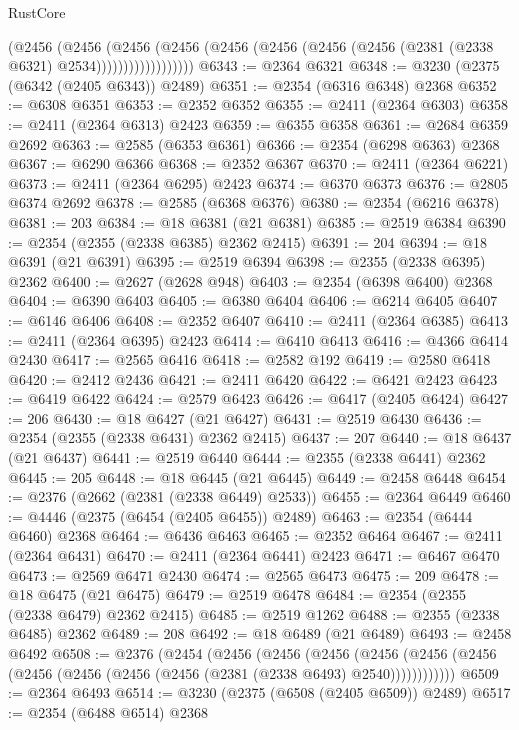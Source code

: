 \begin{lexlean}{RustCore}
\begin{coremodule}
                      (@2456
                        (@2456
                          (@2456
                            (@2456
                              (@2456
                                (@2456 (@2456 (@2456 (@2381 (@2338 @6321) @2534))))))))))))))))))
@6343 := @2364 @6321
@6348 := @3230 (@2375 (@6342 (@2405 @6343)) @2489)
@6351 := @2354 (@6316 @6348) @2368
@6352 := @6308 @6351
@6353 := @2352 @6352
@6355 := @2411 (@2364 @6303)
@6358 := @2411 (@2364 @6313) @2423
@6359 := @6355 @6358
@6361 := @2684 @6359 @2692
@6363 := @2585 (@6353 @6361)
@6366 := @2354 (@6298 @6363) @2368
@6367 := @6290 @6366
@6368 := @2352 @6367
@6370 := @2411 (@2364 @6221)
@6373 := @2411 (@2364 @6295) @2423
@6374 := @6370 @6373
@6376 := @2805 @6374 @2692
@6378 := @2585 (@6368 @6376)
@6380 := @2354 (@6216 @6378)
@6381 := 203
@6384 := @18 @6381 (@21 @6381)
@6385 := @2519 @6384
@6390 := @2354 (@2355 (@2338 @6385) @2362 @2415)
@6391 := 204
@6394 := @18 @6391 (@21 @6391)
@6395 := @2519 @6394
@6398 := @2355 (@2338 @6395) @2362
@6400 := @2627 (@2628 @948)
@6403 := @2354 (@6398 @6400) @2368
@6404 := @6390 @6403
@6405 := @6380 @6404
@6406 := @6214 @6405
@6407 := @6146 @6406
@6408 := @2352 @6407
@6410 := @2411 (@2364 @6385)
@6413 := @2411 (@2364 @6395) @2423
@6414 := @6410 @6413
@6416 := @4366 @6414 @2430
@6417 := @2565 @6416
@6418 := @2582 @192
@6419 := @2580 @6418
@6420 := @2412 @2436
@6421 := @2411 @6420
@6422 := @6421 @2423
@6423 := @6419 @6422
@6424 := @2579 @6423
@6426 := @6417 (@2405 @6424)
@6427 := 206
@6430 := @18 @6427 (@21 @6427)
@6431 := @2519 @6430
@6436 := @2354 (@2355 (@2338 @6431) @2362 @2415)
@6437 := 207
@6440 := @18 @6437 (@21 @6437)
@6441 := @2519 @6440
@6444 := @2355 (@2338 @6441) @2362
@6445 := 205
@6448 := @18 @6445 (@21 @6445)
@6449 := @2458 @6448
@6454 := @2376 (@2662 (@2381 (@2338 @6449) @2533))
@6455 := @2364 @6449
@6460 := @4446 (@2375 (@6454 (@2405 @6455)) @2489)
@6463 := @2354 (@6444 @6460) @2368
@6464 := @6436 @6463
@6465 := @2352 @6464
@6467 := @2411 (@2364 @6431)
@6470 := @2411 (@2364 @6441) @2423
@6471 := @6467 @6470
@6473 := @2569 @6471 @2430
@6474 := @2565 @6473
@6475 := 209
@6478 := @18 @6475 (@21 @6475)
@6479 := @2519 @6478
@6484 := @2354 (@2355 (@2338 @6479) @2362 @2415)
@6485 := @2519 @1262
@6488 := @2355 (@2338 @6485) @2362
@6489 := 208
@6492 := @18 @6489 (@21 @6489)
@6493 := @2458 @6492
@6508 := @2376
    (@2454
      (@2456
        (@2456
          (@2456
            (@2456 (@2456 (@2456 (@2456 (@2456 (@2456 (@2456 (@2381 (@2338 @6493) @2540))))))))))))
@6509 := @2364 @6493
@6514 := @3230 (@2375 (@6508 (@2405 @6509)) @2489)
@6517 := @2354 (@6488 @6514) @2368

\end{coremodule}
\end{lexlean}
